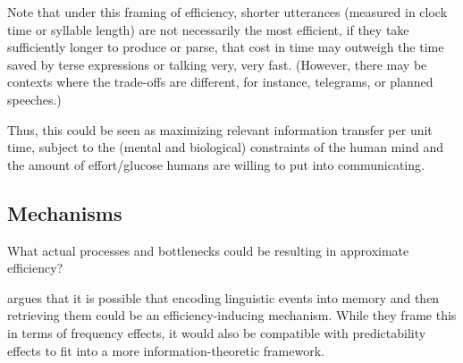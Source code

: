 \documentclass[]{article}
\begin{document}
Note that under this framing of efficiency, shorter utterances (measured in clock time or syllable length) are not necessarily the most efficient, if they take sufficiently longer to produce or parse, that cost in time may outweigh the time saved by terse expressions or talking very, very fast. (However, there may be contexts where the trade-offs are different, for instance, telegrams, or planned speeches.)

Thus, this could be seen as maximizing relevant information transfer per unit time, subject to the (mental and biological) constraints of the human mind and the amount of effort/glucose humans are willing to put into communicating. 

%
%
%
%

\subsection{Mechanisms}
What actual processes and bottlenecks could be resulting in approximate efficiency?

\cite{bybee2006} argues that it is possible that encoding linguistic events into memory and then retrieving them could be an efficiency-inducing mechanism. While they frame this in terms of frequency effects, it would also be compatible with predictability effects to fit into a more information-theoretic framework. %
\end{document}
